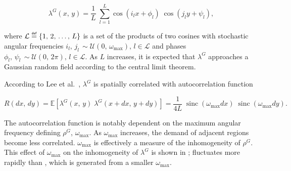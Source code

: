 \documentclass[12pt,dvipsnames]{report}
\newcommand\defeq{\mathrel{\overset{\makebox[0pt]{\mbox{\normalfont\tiny\sffamily def}}}{=}}}
\DeclareMathOperator{\sinc}{sinc}
\begin{document}
\begin{equation} \label{eq:lambdaG}
	\lambda^G\left( x,\, y \right) = \frac{1}{L} \; \sum_{l=1}^L \cos\left( i_l x + \phi_l \right) \; \cos\left( j_l y + \psi_l \right),
\end{equation}

\noindent where $\mathcal{L} \defeq \left\{ 1,\, 2,\, \ldots,\, L \right\}$ is a set of the products of two cosines with stochastic angular frequencies $i_l,\, j_l\, \sim \mathcal{U}\left( 0,\, \omega_{\max} \right),\, l \in \mathcal{L}$ and phases $\phi_l,\, \psi_l\, \sim \mathcal{U}\left( 0,\, 2 \pi \right),\, l \in \mathcal{L}$.  As $L$ increases, it is expected that $\lambda^G$ approaches a Gaussian random field according to the central limit theorem.

According to Lee et al.~\cite{6554749}, $\lambda^G$ is spatially correlated with autocorrelation function

\begin{equation} \label{eq:sslt_autocorrelation}
	R\left( dx,\, dy \right) = \mathbb{E}\left[ \lambda^G\left( x,\, y \right) \; \lambda^G\left( x + dx,\, y + dy \right) \right] = \frac{1}{4L} \; \sinc\left( \omega_{\max} dx \right) \; \sinc\left( \omega_{\max} dy \right).
\end{equation}

\noindent The autocorrelation function is notably dependent on the maximum angular frequency defining $\rho^G$, $\omega_{\max}$.  As $\omega_{\max}$ increases, the demand of adjacent regions become less correlated.  $\omega_{\max}$ is effectively a measure of the inhomogeneity of $\rho^G$.  This effect of $\omega_{\max}$ on the inhomogeneity of $\lambda^G$ is shown in ;  fluctuates more rapidly than , which is generated from a smaller $\omega_{\max}$.
\end{document}
